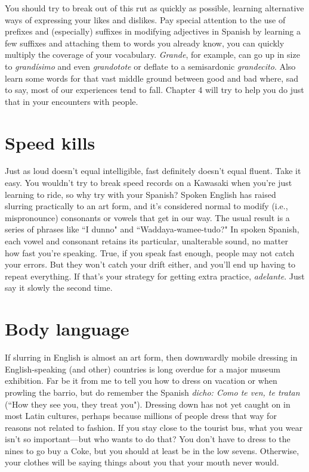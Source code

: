 You should try to break out of this rut as quickly as possible,
learning alternative ways of expressing your likes and dislikes. Pay special attention to the use of prefixes and (especially) suffixes in modifying adjectives in Spanish by learning a few suffixes and attaching
them to words you already know, you can quickly multiply the coverage of your vocabulary. \emph{Grande}, for example, can go up in size to \emph{grandísimo} and even \emph{grandotote} or deflate to a semisardonic \emph{grandecito}.
Also learn some words for that vast middle ground between good and
bad where, sad to say, most of our experiences tend to fall. Chapter 4
will try to help you do just that in your encounters with people.

\section{Speed kills}

Just as loud doesn't equal intelligible, fast definitely doesn't
equal fluent. Take it easy. You wouldn't try to break speed records on a
Kawasaki when you're just learning to ride, so why try with your Spanish? Spoken English has raised slurring practically to an art form, and
it's considered normal to modify (i.e., mispronounce) consonants or
vowels that get in our way. The usual result is a series of phrases like
``I dunno" and ``Waddaya-wamee-tudo?" In spoken Spanish, each vowel
and consonant retains its particular, unalterable sound, no matter how
fast you're speaking. True, if you speak fast enough, people may not
catch your errors. But they won't catch your drift either, and you'll end
up having to repeat everything. If that's your strategy for getting extra
practice, \emph{adelante}. Just say it slowly the second time.

\section{Body language}

If slurring in English is almost an art form, then downwardly
mobile dressing in English-speaking (and other) countries is long overdue for a major museum exhibition. Far be it from me to tell you how
to dress on vacation or when prowling the barrio, but do remember the
Spanish \emph{dicho: Como te ven, te tratan} (``How they see you, they treat
you"). Dressing down has not yet caught on in most Latin cultures,
perhaps because millions of people dress that way for reasons not related to fashion. If you stay close to the tourist bus, what you wear
isn't so important---but who wants to do that? You don't have to dress
to the nines to go buy a Coke, but you should at least be in the low
sevens. Otherwise, your clothes will be saying things about you that
your mouth never would.

